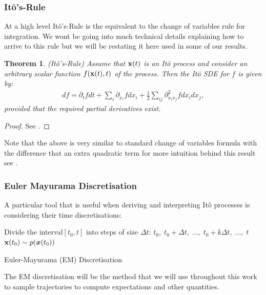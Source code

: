 \documentclass[a4paper,12pt,twoside,openright]{report}
\newtheorem{theorem}{Theorem}
\theoremstyle{definition}
\begin{document}
\subsubsection{Itô's-Rule}

At a high level Itô's-Rule is the equivalent to the change of variables rule for integration. We wont be going into much technical details explaining how to arrive to this rule but we will be restating it here used in some of our results. 

\begin{theorem}
  (Itô's-Rule) Assume that ${\mathbf{x}}(t)$ is an Itô process and consider an arbitrary scalar function $f({\mathbf{x}}(t), t)$ of the process. Then the Itô SDE for $f$ is given by:
  \begin{align}\label{eq:ito_rule}
      df = \partial_t f dt + \sum_i \partial_{{x_i}} f dx_i + \frac{1}{2}\sum_{ij} \partial^2_{{x_i}{x_j}} f dx_i dx_j,
  \end{align}
  provided that the required partial derivatives exist. 
\end{theorem}
\begin{proof}
See \cite{oksendal2003stochastic}.
\end{proof}
Note that the above is very similar to standard change of variables formula with the difference that an extra quadratic term for more intuition behind this result see \cite[Chapter~4]{sarkka2019applied}.

\subsubsection{Euler Mayurama Discretisation}

A particular tool that is useful when deriving and interpreting Itô processes is considering their time discretisations:
\begin{algorithm} \label{alg:em}
Divide the interval$[t_0, t]$ into steps of size $\Delta t$: $t_0, \;t_0 + \Delta t,\; \hdots ,\; t_0 + k \Delta t,\; \hdots, \;t$ \\
${\mathbf{x}}(t_0) \sim p({\bm{x}}(t_0))$\\
\caption{Euler-Mayurama (EM) Discretisation }
\end{algorithm}
The EM discretisation will be the method that we will use throughout this work to sample trajectories to compute expectations and other quantities.
\end{document}
